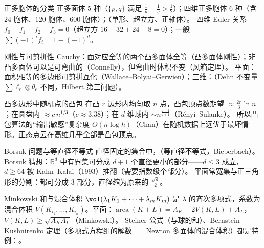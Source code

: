 \begin{结论}{正多胞体的分类}
正多面体 $5$ 种（$\{p,q\}$ 满足 $\frac1p+\frac1q>\frac12$）；四维正多胞体 $6$ 种（含 $24$ 胞体、$120$ 胞体、$600$ 胞体）；（单形、超立方、正轴体）。
四维 Euler 关系 $f_0-f_1+f_2-f_3=0$（超立方 $16-32+24-8=0$）；一般 $\sum(-1)^if_i=1-(-1)^d$。
\end{结论}

\begin{结论}{刚性与可剪拼性}
Cauchy：面对应全等的两个凸多面体全等（凸多面体刚性）；非凸多面体可以是可弯曲的（Connelly），但弯曲时体积不变（风箱定理）。
平面：面积相等的多边形可剪拼互化（Wallace--Bolyai--Gerwien）；三维：（Dehn 不变量 $\sum\ell_e\otimes\theta_e$ 不同，Hilbert 第三问题）。
\end{结论}

\begin{结论}{凸多边形中随机点的凸包}
在凸 $r$ 边形内均匀取 $n$ 点，凸包顶点数期望 $\approx\frac{2r}3\ln n$；在圆盘内 $\approx c\,n^{1/3}$（$c\approx3.38$）；在 $d$ 维球内 $\sim n^{\frac{d-1}{d+1}}$（Rényi--Sulanke）。
所以凸包算法的“输出敏感”复杂度 $O(n\log h)$（Chan）在随机数据上远优于最坏情形。正态点云在高维几乎全部是凸包顶点。
\end{结论}

\begin{结论}{Borsuk 问题与等直径不等式}
直径固定的集合中，（等直径不等式，Bieberbach）。Borsuk 猜想：$\mathbb R^d$ 中有界集可分成 $d+1$ 个直径更小的部分——$d\le3$ 成立，$d\ge64$ 被 Kahn--Kalai（1993）推翻（需要指数级个部分）。
平面常宽集与正三角形的分割：都可分成 $3$ 部分，直径缩为原来的 $\frac{\sqrt3}2$。
\end{结论}

\begin{结论}{Minkowski 和与混合体积}
$\vol(\lambda_1K_1+\cdots+\lambda_mK_m)$ 是 $\lambda$ 的齐次多项式，系数为混合体积 $V(K_{i_1},\dots,K_{i_n})$。平面：$\operatorname{area}(K+L)=A_K+2V(K,L)+A_L$，$V(K,L)\ge\sqrt{A_KA_L}$（Minkowski）。
Steiner 公式（与球的和）、Bernstein--Kushnirenko 定理（多项式方程组的解数 $=$ Newton 多面体的混合体积）都是特例：。
\end{结论}


